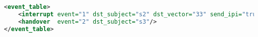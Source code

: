 \begin{lstlisting}[language=xml, label=lst:event-table, caption=Subject event table]
<event_table>
    <interrupt event="1" dst_subject="s2" dst_vector="33" send_ipi="true"/>
    <handover  event="2" dst_subject="s3"/>
</event_table>
\end{lstlisting}
